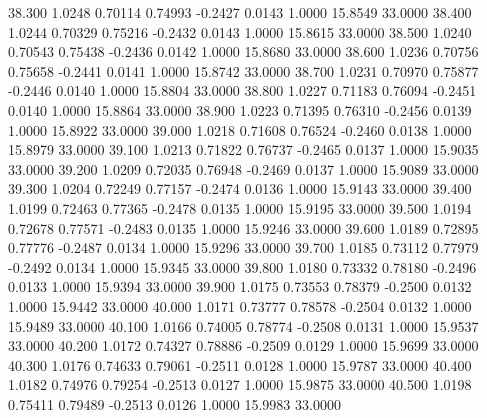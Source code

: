   38.300   1.0248   0.70114   0.74993  -0.2427   0.0143   1.0000  15.8549  33.0000
  38.400   1.0244   0.70329   0.75216  -0.2432   0.0143   1.0000  15.8615  33.0000
  38.500   1.0240   0.70543   0.75438  -0.2436   0.0142   1.0000  15.8680  33.0000
  38.600   1.0236   0.70756   0.75658  -0.2441   0.0141   1.0000  15.8742  33.0000
  38.700   1.0231   0.70970   0.75877  -0.2446   0.0140   1.0000  15.8804  33.0000
  38.800   1.0227   0.71183   0.76094  -0.2451   0.0140   1.0000  15.8864  33.0000
  38.900   1.0223   0.71395   0.76310  -0.2456   0.0139   1.0000  15.8922  33.0000
  39.000   1.0218   0.71608   0.76524  -0.2460   0.0138   1.0000  15.8979  33.0000
  39.100   1.0213   0.71822   0.76737  -0.2465   0.0137   1.0000  15.9035  33.0000
  39.200   1.0209   0.72035   0.76948  -0.2469   0.0137   1.0000  15.9089  33.0000
  39.300   1.0204   0.72249   0.77157  -0.2474   0.0136   1.0000  15.9143  33.0000
  39.400   1.0199   0.72463   0.77365  -0.2478   0.0135   1.0000  15.9195  33.0000
  39.500   1.0194   0.72678   0.77571  -0.2483   0.0135   1.0000  15.9246  33.0000
  39.600   1.0189   0.72895   0.77776  -0.2487   0.0134   1.0000  15.9296  33.0000
  39.700   1.0185   0.73112   0.77979  -0.2492   0.0134   1.0000  15.9345  33.0000
  39.800   1.0180   0.73332   0.78180  -0.2496   0.0133   1.0000  15.9394  33.0000
  39.900   1.0175   0.73553   0.78379  -0.2500   0.0132   1.0000  15.9442  33.0000
  40.000   1.0171   0.73777   0.78578  -0.2504   0.0132   1.0000  15.9489  33.0000
  40.100   1.0166   0.74005   0.78774  -0.2508   0.0131   1.0000  15.9537  33.0000
  40.200   1.0172   0.74327   0.78886  -0.2509   0.0129   1.0000  15.9699  33.0000
  40.300   1.0176   0.74633   0.79061  -0.2511   0.0128   1.0000  15.9787  33.0000
  40.400   1.0182   0.74976   0.79254  -0.2513   0.0127   1.0000  15.9875  33.0000
  40.500   1.0198   0.75411   0.79489  -0.2513   0.0126   1.0000  15.9983  33.0000

